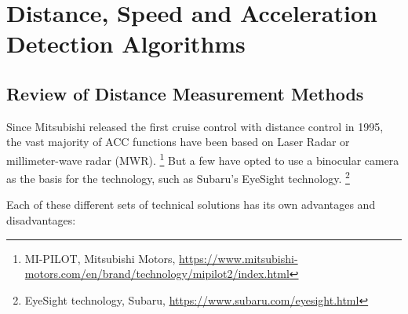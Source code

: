 %
%


\chapter{Distance,  Speed and Acceleration Detection Algorithms}

\section{Review of Distance Measurement Methods}

Since Mitsubishi released the first cruise control with distance control in 1995, the vast majority of ACC functions have been based on Laser Radar or millimeter-wave radar (MWR). \footnote{MI-PILOT, Mitsubishi Motors, \url{https://www.mitsubishi-motors.com/en/brand/technology/mipilot2/index.html}} But a few have opted to use a binocular camera as the basis for the technology, such as Subaru's EyeSight technology. \footnote{EyeSight technology, Subaru, \url{https://www.subaru.com/eyesight.html}}

Each of these different sets of technical solutions has its own advantages and disadvantages:

